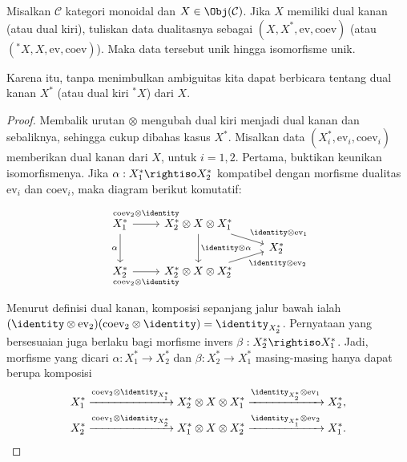 \begin{definition-proposition}\label{def:dual-uniqueness}
	Misalkan $\mathcal{C}$ kategori monoidal dan
	$X\in\Obj(\mathcal{C})$. Jika $X$ memiliki dual kanan (atau dual kiri),
	tuliskan data dualitasnya sebagai
	$(X,X^*,\mathrm{ev},\mathrm{coev})$ (atau
	$({}^*X,X,\mathrm{ev},\mathrm{coev})$). Maka data tersebut unik hingga
	isomorfisme unik.

	Karena itu, tanpa menimbulkan ambiguitas kita dapat berbicara tentang dual
	kanan $X^*$ (atau dual kiri ${}^*X$) dari $X$.
\end{definition-proposition}
\begin{proof}
	Membalik urutan $\otimes$ mengubah dual kiri menjadi dual kanan dan
	sebaliknya, sehingga cukup dibahas kasus $X^*$. Misalkan data
	$(X_i^*,\mathrm{ev}_i,\mathrm{coev}_i)$ memberikan dual kanan dari $X$,
	untuk $i=1,2$. Pertama, buktikan keunikan isomorfismenya. Jika
	$\alpha:X_1^*\rightiso X_2^*$ kompatibel dengan morfisme dualitas
	$\mathrm{ev}_i$ dan $\mathrm{coev}_i$, maka diagram berikut komutatif:
	\[\begin{tikzcd}[row sep=tiny]
		X_1^* \arrow[dd, "\alpha"'] \arrow[r, "{\mathrm{coev}_2 \otimes \identity}" inner sep=0.6em] & X_2^* \otimes X \otimes X_1^* \arrow[dd, "{\identity \otimes \alpha}"] \arrow[rd, "{\identity \otimes \mathrm{ev}_1}"] & \\
		& & X_2^* \\
		X_2^* \arrow[r, "{\mathrm{coev}_2 \otimes \identity}"' inner sep=0.6em] & X_2^* \otimes X \otimes X_2^* \arrow[ru, "{\identity \otimes \mathrm{ev}_2}"'] &
	\end{tikzcd}\]
	Menurut definisi dual kanan, komposisi sepanjang jalur bawah ialah
	$(\identity\otimes\mathrm{ev}_2)(\mathrm{coev}_2\otimes\identity)
	=\identity_{X_2^*}$. Pernyataan yang bersesuaian juga berlaku bagi morfisme
	invers $\beta:X_2^*\rightiso X_1^*$. Jadi, morfisme yang dicari
	$\alpha:X_1^*\to X_2^*$ dan $\beta:X_2^*\to X_1^*$ masing-masing hanya
	dapat berupa komposisi
	\begin{gather*}
		X_1^* \xrightarrow{\mathrm{coev}_2 \otimes \identity_{X_1^*}} X_2^* \otimes X \otimes X_1^* \xrightarrow{\identity_{X_2^*} \otimes \mathrm{ev}_1} X_2^* , \\
		X_2^* \xrightarrow{\mathrm{coev}_1 \otimes \identity_{X_2^*}} X_1^* \otimes X \otimes X_2^* \xrightarrow{\identity_{X_1^*} \otimes \mathrm{ev}_2} X_1^* .
	\end{gather*}


\end{proof}
